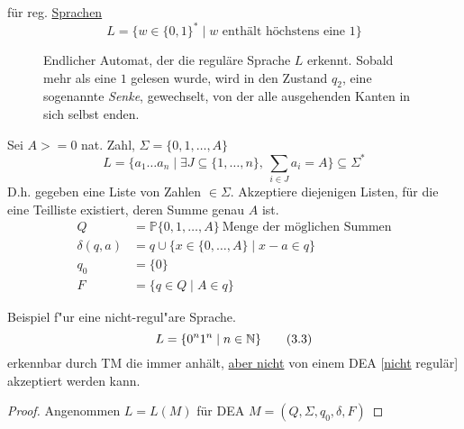 \begin{Bsp} für reg. \underline{Sprachen}
	\begin{equation*}
		L=\{ w\in\{0,1\}^* \mid w\text{ enthält höchstens eine 1} \} \tag{3.1}\label{bsp:3.1}
	\end{equation*}
	\begin{figure}[H]\centering
		\caption{Endlicher Automat, der die reguläre Sprache $L$ erkennt. Sobald mehr als eine $1$ gelesen wurde, wird in den Zustand $q_2$, eine sogenannte \emph{Senke}, gewechselt, von der alle ausgehenden Kanten in sich selbst enden.}
	\end{figure}
	
	Sei $A>=0$ nat. Zahl, $\Sigma=\{0,1,\dots,A\}$
	\begin{equation*}
		L = \{ a_1\dots a_n \mid \exists J\subseteq \{1,\dots,n \},\ \sum_{i\in J} a_i = A \} \subseteq \Sigma^* \tag{3.2}\label{bsp:3.2}
	\end{equation*}
	D.h. gegeben eine Liste von Zahlen $\in\Sigma$.
	Akzeptiere diejenigen Listen, für die eine Teilliste existiert, deren Summe genau $A$ ist.
	\begin{align*}
		Q &=\mathbb{P}\{0,1,\dots,A\} \ \text{Menge der möglichen Summen}\\
		\delta(q,a) &= q \cup \{ x\in \{0,\dots,A\} \mid x-a \in q \} \\
		q_0 &=\{0\} \\
		F &= \{ q\in Q \mid A \in q \}
	\end{align*}
	
	Beispiel f"ur eine nicht-regul"are Sprache.
	\begin{equation*}
		L = \{ 0^n1^n \mid n\in\mathbb{N} \} \tag{3.3}\label{bsp:3.3}
	\end{equation*}
	erkennbar durch \ac{TM} die immer anhält, \underline{aber nicht} von einem \ac{DEA} [\underline{nicht} regulär] akzeptiert werden kann.
	\begin{proof}
		Angenommen $L=L(M)$ für \ac{DEA} $M=(Q,\Sigma,q_0,\delta,F)$
		

\end{proof}
\end{Bsp}
